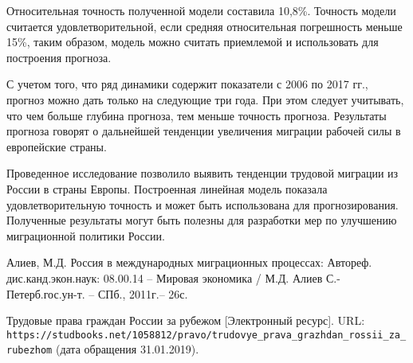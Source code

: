 \documentclass[a4paper,12pt]{article}
\begin{document}
Относительная точность полученной модели составила 10,8\%. Точность модели считается удовлетворительной, если средняя относительная погрешность меньше 15\%, таким образом, модель можно считать приемлемой и использовать для построения прогноза.

С учетом того, что ряд динамики содержит показатели с 2006 по 2017 гг., прогноз можно дать только на следующие три года. При этом следует учитывать, что чем больше глубина прогноза, тем меньше точность прогноза. Результаты прогноза говорят о дальнейшей тенденции увеличения миграции рабочей силы в европейские страны.

Проведенное исследование позволило выявить тенденции трудовой миграции из России в страны Европы. Построенная линейная модель показала удовлетворительную точность и может быть использована для прогнозирования. Полученные результаты могут быть полезны для разработки мер по улучшению миграционной политики России.

\begin{thebibliography}{9}
    Алиев, М.Д. Россия в международных миграционных процессах: Автореф. дис.канд.экон.наук: 08.00.14 – Мировая экономика / М.Д. Алиев С.-Петерб.гос.ун-т. – СПб., 2011г.– 26с.
    
    Трудовые права граждан России за рубежом [Электронный ресурс]. URL: \texttt{https://studbooks.net/1058812/pravo/trudovye\_prava\_grazhdan\_rossii\_za\_rubezhom} (дата обращения 31.01.2019).
\end{thebibliography}
\end{document}
